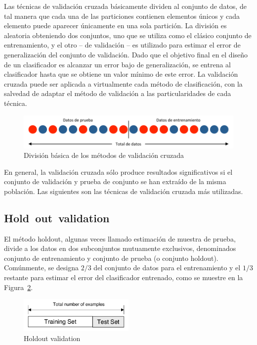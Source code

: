 \documentclass{article}
\begin{document}
Las técnicas de validación cruzada básicamente dividen al conjunto de datos, de tal manera que cada una de las particiones contienen elementos únicos y cada elemento puede aparecer únicamente en una sola partición.
La división es aleatoria obteniendo dos conjuntos, uno que se utiliza como el clásico conjunto de entrenamiento, y el otro -- de validación -- es utilizado para estimar el error de generalización del conjunto de validación.
Dado que el objetivo final en el diseño de un clasificador es alcanzar un error bajo de generalización, se entrena al clasificador hasta que se obtiene un valor mínimo de este error.
La validación cruzada puede ser aplicada a virtualmente cada método de clasificación, con la salvedad de adaptar el método de validación a las particularidades de cada técnica.

\begin{figure}
	\centering
	\includegraphics[width=\textwidth]{resources/images/validacion-cruzada-general}
	\caption{División básica de los métodos de validación cruzada}
	\label{fig:validacion-cruzada-general}
\end{figure}

En general, la validación cruzada sólo produce resultados significativos si el conjunto de validación y prueba de conjunto se han extraído de la misma población.
Las siguientes son las técnicas de validación cruzada más utilizadas.


\subsection{Hold out validation}
El método holdout, algunas veces llamado estimación de muestra de prueba, divide a los datos en dos subconjuntos mutuamente exclusivos, denominados conjunto de entrenamiento y conjunto de prueba (o conjunto holdout).
Comúnmente, se designa $2/3$ del conjunto de datos para el entrenamiento y el $1/3$ restante para estimar el error del clasificador entrenado, como se muestre en la Figura~\ref{fig:holdout-validation}.
\begin{figure}
	\centering
	\includegraphics[width=0.5\textwidth]{resources/images/holdout}
	\caption{Holdout validation}
	\label{fig:holdout-validation}
\end{figure}
\end{document}
